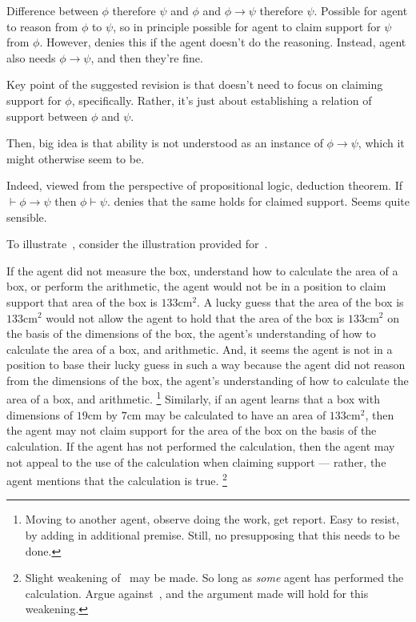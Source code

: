 \begin{note}[Simplest]
  \color{red}
  Difference between \(\phi\) therefore \(\psi\) and \(\phi\) and \(\phi \rightarrow \psi\) therefore \(\psi\).
  Possible for agent to reason from \(\phi\) to \(\psi\), so in principle possible for agent to claim support for \(\psi\) from \(\phi\).
  However, \ESU{} denies this if the agent doesn't do the reasoning.
  Instead, agent also needs \(\phi \rightarrow \psi\), and then they're fine.

  Key point of the suggested revision is that \ESU{} doesn't need to focus on claiming support for \(\phi\), specifically.
  Rather, it's just about establishing a relation of support between \(\phi\) and \(\psi\).

  Then, big idea is that ability is not understood as an instance of \(\phi \rightarrow \psi\), which it might otherwise seem to be.

  Indeed, viewed from the perspective of propositional logic, deduction theorem.
  If \(\vdash \phi \rightarrow \psi\) then \(\phi \vdash \psi\).
  \ESU{} denies that the same holds for claimed support.
  Seems quite sensible.
\end{note}

\begin{note}[Illustration]
  To illustrate~\ESU{}, consider the illustration provided for~\USE{}.

    If the agent did not measure the box, understand how to calculate the area of a box, or perform the arithmetic, the agent would not be in a position to claim support that area of the box is \(133\text{cm}^{2}\).
  A lucky guess that the area of the box is \(133\text{cm}^{2}\) would not allow the agent to hold that the area of the box is  \(133\text{cm}^{2}\) on the basis of the dimensions of the box, the agent's understanding of how to calculate the area of a box, and arithmetic.
  And, it seems the agent is not in a position to base their lucky guess in such a way because the agent did not reason from the dimensions of the box, the agent's understanding of how to calculate the area of a box, and arithmetic.\nolinebreak
  \footnote{
    Moving to another agent, observe doing the work, get report.
    Easy to resist, by adding in additional premise.
    Still, no presupposing that this needs to be done.
  }
  Similarly, if an agent learns that a box with dimensions of \(19\text{cm}\) by \(7\text{cm}\) may be calculated to have an area of \(133\text{cm}^{2}\), then the agent may not claim support for the area of the box on the basis of the calculation.
  If the agent has not performed the calculation, then the agent may not appeal to the use of the calculation when claiming support --- rather, the agent mentions that the calculation is true.\nolinebreak
  \footnote{
    Slight weakening of~\ESU{} may be made.
    So long as \emph{some} agent has performed the calculation.
    Argue against~\ESU{}, and the argument made will hold for this weakening.
  }
\end{note}

